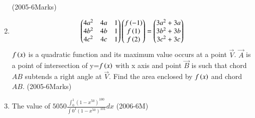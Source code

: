 \documentclass[journal,12pt,twocolumn]{IEEEtran}
\theoremstyle{remark}
\begin{document}
\begin{enumerate}
\hfill{(2005-6Marks)}
\item 
  \[
\begin{pmatrix} 4a^2 & 4a & 1\\4b^2 & 4b & 1\\4c^2 & 4c & 1\end{pmatrix}
\begin{pmatrix}f\left(-1\right)\\f\left(1\right)\\f\left(2\right)\end{pmatrix} =
\begin{pmatrix}3a^2+3a\\3b^2+3b\\3c^2+3c\end{pmatrix}
\]
$f\left(x\right)$ is a quadratic function and its maximum value occurs at a point $\vec{V}$. $\vec{A}$ is a point of intersection of y=$f\left(x\right)$ with x axis and point $\vec{B}$ is such that chord $AB$ subtends a right angle at $\vec{V}$. Find the area enclosed by $f\left(x\right)$ and chord $AB$. 
\hfill{(2005-6Marks)}
\item The value of $5050 \frac{\int_{0}^{1}(1-x^50)^100}{\int{0}^{1} {(1-x^50)^101}}dx$
\hfill{(2006-6M)}


\end{enumerate}
\end{document}
